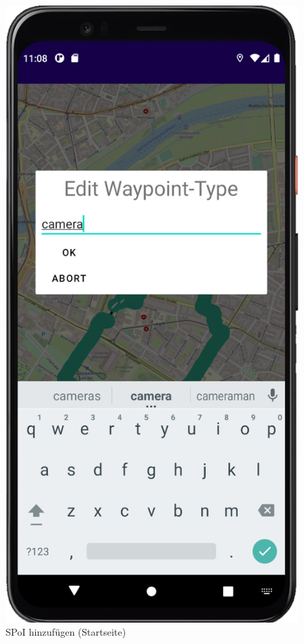 \documentclass{article}
\begin{document}
\begin{enumerate}
\begin{figure}[H]
		 		\centering
				\caption{SPoI hinzufügen (Startseite)}
			\endminipage\hfill
		  		\includegraphics[width=\linewidth]{spoi_pic3_3.png}

\end{figure}
\end{enumerate}
\end{document}

